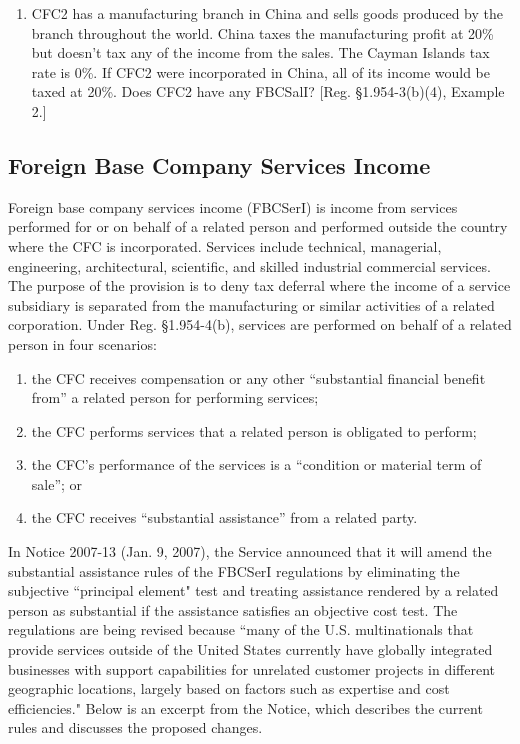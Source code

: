 \begin{select}
\begin{enumerate}
				\item CFC2 has a manufacturing branch in China and sells goods produced by the branch throughout the world.  China taxes the manufacturing profit at 20\% but doesn't tax any of the income from the sales.  The Cayman Islands tax rate is 0\%.  If CFC2 were incorporated in China, all of its income would be taxed at 20\%.   Does CFC2 have any FBCSalI?   [Reg. \S 1.954-3(b)(4), Example 2.]
				\end{enumerate}
		\end{select}
		
	
		\subsection{Foreign Base Company Services Income}

Foreign base company services income (FBCSerI) is income from services performed for or on behalf of a related person and performed outside the country where the CFC is incorporated.  Services include technical, managerial, engineering, architectural, scientific, and skilled industrial commercial services.  The purpose of the provision is to deny tax deferral where the income of a service subsidiary is separated from the manufacturing or similar activities of a related corporation.  Under Reg. \S1.954-4(b), services are performed on behalf of a related person in four scenarios:

\begin{enumerate}
	\item the CFC receives compensation or any other ``substantial financial benefit from'' a related person for performing services;
	\item the CFC performs services that a  related person is obligated to perform;
	\item the CFC's performance of the services is a ``condition or material term of sale''; or
	\item the CFC receives ``substantial assistance'' from a related party.
\end{enumerate}  

In Notice 2007-13 (Jan. 9, 2007), the Service announced that it will amend the substantial assistance rules of the FBCSerI regulations by eliminating the subjective ``principal element" test and treating assistance rendered by a related person as substantial if the assistance satisfies an objective cost test.  The regulations are being revised because ``many of the U.S. multinationals that provide services outside of the United States currently have globally integrated businesses with support capabilities for unrelated customer projects in different geographic locations, largely based on factors such as expertise and cost efficiencies."  Below is an excerpt from the Notice, which describes the current rules and discusses the proposed changes.


